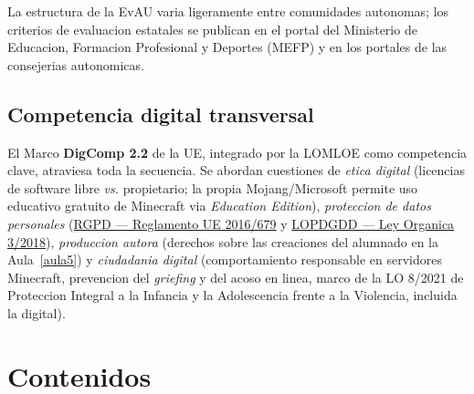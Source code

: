 \documentclass[12pt,a4paper]{scrartcl}
\newcommand{\acc}[1]{\textcolor{accent}{\textbf{#1}}}
\begin{document}
La estructura de la EvAU varia ligeramente entre comunidades autonomas; los criterios de evaluacion estatales se publican en el portal del Ministerio de Educacion, Formacion Profesional y Deportes (MEFP) y en los portales de las consejerias autonomicas.

\subsection{Competencia digital transversal}

El Marco \acc{DigComp 2.2} de la UE, integrado por la LOMLOE como competencia clave, atraviesa toda la secuencia. Se abordan cuestiones de \emph{etica digital} (licencias de software libre \emph{vs.} propietario; la propia Mojang/Microsoft permite uso educativo gratuito de Minecraft via \emph{Education Edition}), \emph{proteccion de datos personales} (\href{https://eur-lex.europa.eu/eli/reg/2016/679/oj}{RGPD --- Reglamento UE 2016/679} y \href{https://www.boe.es/buscar/act.php?id=BOE-A-2018-16673}{LOPDGDD --- Ley Organica 3/2018}), \emph{produccion autora} (derechos sobre las creaciones del alumnado en la Aula~\ref{aula5}) y \emph{ciudadania digital} (comportamiento responsable en servidores Minecraft, prevencion del \emph{griefing} y del acoso en linea, marco de la LO 8/2021 de Proteccion Integral a la Infancia y la Adolescencia frente a la Violencia, incluida la digital).

\section{Contenidos}\label{sec:conteudos}
\end{document}
